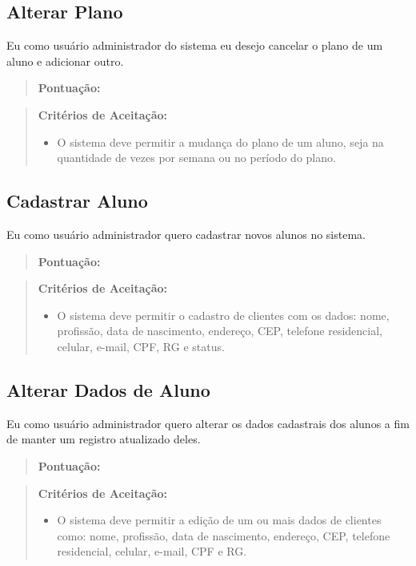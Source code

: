 \subsection[Alterar Plano]{Alterar Plano}
Eu como usuário administrador do sistema eu desejo cancelar o plano de um aluno e adicionar outro.
\begin{quote}
    \textbf{Pontuação:}
\end{quote}
\begin{quote}
\textbf{Critérios de Aceitação:}
    \begin{itemize}
        \item O sistema deve permitir a mudança do plano de um aluno, seja na quantidade de vezes por semana ou no período do plano.
    \end{itemize}
\end{quote}

\subsection[Cadastrar Aluno]{Cadastrar Aluno}
Eu como usuário administrador quero cadastrar novos alunos no sistema.
\begin{quote}
    \textbf{Pontuação:}
\end{quote}
\begin{quote}
\textbf{Critérios de Aceitação:}
    \begin{itemize}
        \item O sistema deve permitir o cadastro de clientes com os dados: nome, profissão, data de nascimento, endereço, CEP, telefone residencial, celular, e-mail, CPF, RG e status.
    \end{itemize}
\end{quote}

\subsection[Alterar Dados de Aluno]{Alterar Dados de Aluno}
Eu como usuário administrador quero alterar os dados cadastrais dos alunos a fim
de manter um registro atualizado deles.
\begin{quote}
    \textbf{Pontuação:}
\end{quote}
\begin{quote}
\textbf{Critérios de Aceitação:}
    \begin{itemize}
        \item O sistema deve permitir a edição de um ou mais dados de clientes como: nome,
        profissão, data de nascimento, endereço, CEP, telefone residencial, celular,
        e-mail, CPF e RG.
    \end{itemize}
\end{quote}

